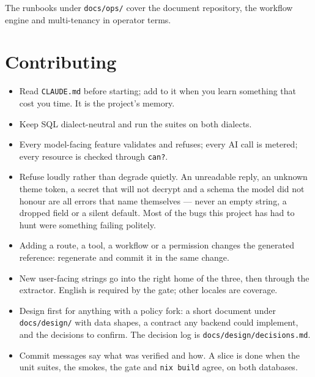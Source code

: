 \documentclass[11pt,a4paper]{report}
\gdef\currentchapterart{art/telemachus-head.png}
\newcommand{\chapterart}[1]{\gdef\currentchapterart{#1}}
\newcommand{\chapterart}[1]{}
\begin{document}
The runbooks under \texttt{docs/ops/} cover the document repository, the workflow engine and multi-tenancy in operator terms.

\chapterart{art/ch-18-contributing.png}
\chapter{Contributing}

\begin{itemize}
\item Read \texttt{CLAUDE.md} before starting; add to it when you learn something that cost you time. It is the project's memory.
\item Keep SQL dialect-neutral and run the suites on both dialects.
\item Every model-facing feature validates and refuses; every AI call is metered; every resource is checked through \texttt{can?}.
\item Refuse loudly rather than degrade quietly. An unreadable reply, an unknown theme token, a secret that will not decrypt and a schema the model did not honour are all errors that name themselves --- never an empty string, a dropped field or a silent default. Most of the bugs this project has had to hunt were something failing politely.
\item Adding a route, a tool, a workflow or a permission changes the generated reference: regenerate and commit it in the same change.
\item New user-facing strings go into the right home of the three, then through the extractor. English is required by the gate; other locales are coverage.
\item Design first for anything with a policy fork: a short document under \texttt{docs/design/} with data shapes, a contract any backend could implement, and the decisions to confirm. The decision log is \texttt{docs/design/decisions.md}.
\item Commit messages say what was verified and how. A slice is done when the unit suites, the smokes, the gate and \texttt{nix build} agree, on both databases.
\end{itemize}
\end{document}
